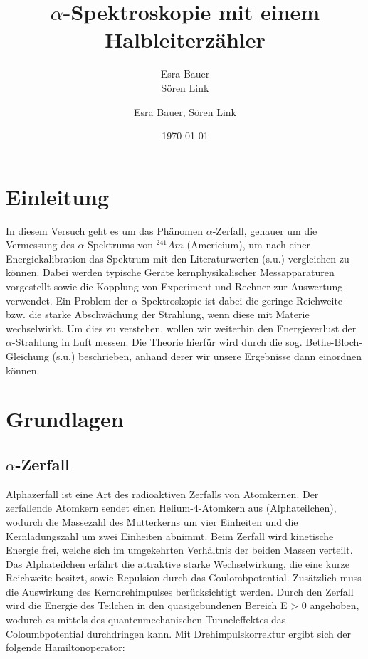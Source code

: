 \documentclass[bigchapter,colorback,accentcolor=tud4b,linedtoc,11pt]{tudreport}
\title{$\alpha$-Spektroskopie mit einem Halbleiterzähler}
\subtitle{Esra Bauer \\Sören Link}
\author{Esra Bauer, Sören Link}
\date{\today}
\begin{document}

\maketitle

\tableofcontents


\chapter{Einleitung}
\color{blue}
In diesem Versuch geht es um das Phänomen $\alpha$-Zerfall, genauer um die Vermessung des $\alpha$-Spektrums von $^{241}Am$ (Americium), um nach einer Energiekalibration das Spektrum mit den Literaturwerten (s.u.) vergleichen zu können. Dabei werden typische Geräte kernphysikalischer Messapparaturen vorgestellt sowie die Kopplung von Experiment und Rechner zur Auswertung verwendet. Ein Problem der $\alpha$-Spektroskopie ist dabei die geringe Reichweite bzw. die starke Abschwächung der Strahlung, wenn diese mit Materie wechselwirkt. Um dies zu verstehen, wollen wir weiterhin den Energieverlust der $\alpha$-Strahlung in Luft messen. Die Theorie hierfür wird durch die sog. Bethe-Bloch-Gleichung (s.u.) beschrieben, anhand derer wir unsere Ergebnisse dann einordnen können.
\color{black}

\chapter{Grundlagen}

\section{$\alpha$-Zerfall}

Alphazerfall ist eine Art des radioaktiven Zerfalls von Atomkernen. Der zerfallende Atomkern sendet einen Helium-4-Atomkern aus (Alphateilchen), wodurch die Massezahl des Mutterkerns um vier Einheiten und die Kernladungszahl um zwei Einheiten abnimmt. Beim Zerfall wird kinetische Energie frei, welche sich im umgekehrten Verhältnis der beiden Massen verteilt. Das Alphateilchen erfährt die attraktive starke Wechselwirkung, die eine kurze Reichweite besitzt, sowie Repulsion durch das Coulombpotential. Zusätzlich muss die Auswirkung des Kerndrehimpulses berücksichtigt werden. Durch den Zerfall wird die Energie des Teilchen in den quasigebundenen Bereich E > 0 angehoben, wodurch es mittels des quantenmechanischen Tunneleffektes das Coloumbpotential durchdringen kann. Mit Drehimpulskorrektur ergibt sich der folgende Hamiltonoperator: 
\end{document}
